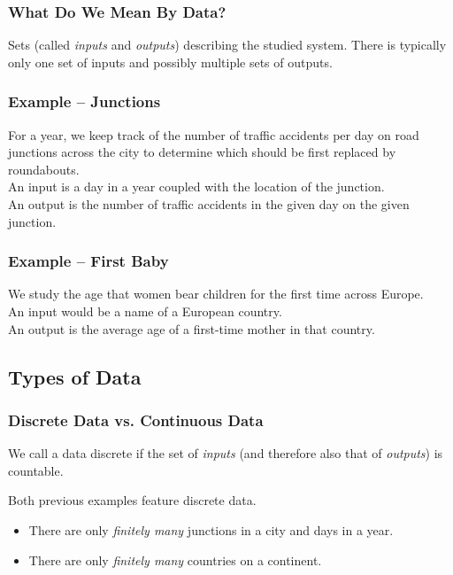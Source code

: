 \documentclass[aspectratio=169,11pt,svgnames]{beamer}
\begin{document}
\begin{frame}
 \frametitle{What Do We Mean By Data?}
 \begin{tcolorbox}[title=Data]
  \alert{Sets} (called \emph{inputs} and \emph{outputs}) describing the studied
  system. There is typically only one set of inputs and possibly multiple sets
  of outputs.
 \end{tcolorbox}
\end{frame}

\begin{frame}
 \frametitle{Example -- Junctions}
 For a year, we keep track of the number of traffic accidents per day on road
 junctions across the city to determine which should be first replaced by
 roundabouts.\\
 \pause
 An \alert{input} is a day in a year coupled with the location of the
 junction.\\
 \pause
 An \alert{output} is the number of traffic accidents in the given day on the
 given junction.
\end{frame}

\begin{frame}
 \frametitle{Example -- First Baby}
 We study the age that women bear children for the first time across Europe.\\
 \pause
 An \alert{input} would be a name of a European country.\\
 An \alert{output} is the average age of a first-time mother in that country.
\end{frame}

\subsection{Types of Data}

\begin{frame}
 \subsectionpage
\end{frame}

\begin{frame}
 \frametitle{Discrete Data vs. Continuous Data}
 \begin{tcolorbox}[title=Discrete Data]
  We call a data \alert{discrete} if the set of \emph{inputs} (and therefore also
  that of \emph{outputs}) is \alert{countable}.
 \end{tcolorbox}
 \pause
 Both previous examples feature \alert{discrete} data.
 \begin{itemize}[label=\textbullet]
  \item There are only \emph{finitely many} junctions in a city and days in a
   year.
  \pause
  \item There are only \emph{finitely many} countries on a continent.
 \end{itemize}
\end{frame}
\end{document}
